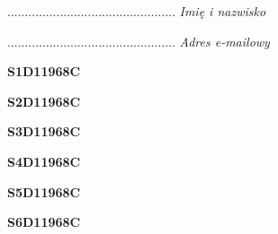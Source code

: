 \begin{turn}{90}\begin{minipage}{\linewidth} \vspace{20mm} ................................................  \textit{Imię i nazwisko}\end{minipage}\end{turn}

\begin{turn}{90}\begin{minipage}{\linewidth} \vspace{20mm} ................................................  \textit{Adres e-mailowy}\end{minipage}\end{turn}

\begin{turn}{90}\huge \begin{minipage}{\linewidth} \vspace{10mm}\textbf{S1D11968C}\end{minipage}\end{turn}

\begin{turn}{90}\huge \begin{minipage}{\linewidth} \vspace{10mm}\textbf{S2D11968C}\end{minipage}\end{turn}

\begin{turn}{90}\huge \begin{minipage}{\linewidth} \vspace{10mm}\textbf{S3D11968C}\end{minipage}\end{turn}

\begin{turn}{90}\huge \begin{minipage}{\linewidth} \vspace{10mm}\textbf{S4D11968C}\end{minipage}\end{turn}

\begin{turn}{90}\huge \begin{minipage}{\linewidth} \vspace{10mm}\textbf{S5D11968C}\end{minipage}\end{turn}

\begin{turn}{90}\huge \begin{minipage}{\linewidth} \vspace{10mm}\textbf{S6D11968C}\end{minipage}\end{turn}

